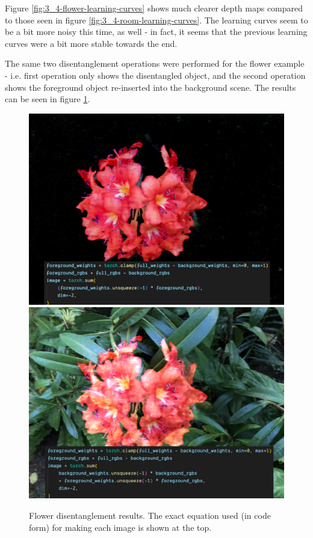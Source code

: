 Figure \ref{fig:3_4-flower-learning-curves} shows much clearer depth maps compared to those seen in figure \ref{fig:3_4-room-learning-curves}. The learning curves seem to be a bit more noisy this time, as well - in fact, it seems that the previous learning curves were a bit more stable towards the end.


The same two disentanglement operations were performed for the flower example - i.e. first operation only shows the disentangled object, and the second operation shows the foreground object re-inserted into the background scene. The results can be seen in figure \ref{fig:3_4-flower-disentanglement}.
\begin{figure}[H]
    \centering
    \includegraphics[width=1.0\textwidth]{figures/3_4-flower-fg.png}
    \includegraphics[width=1.0\textwidth]{figures/3_4-flower-recombined-no-rgbclamp.png}

    \caption{Flower disentanglement results. The exact equation used (in code form) for making each image is shown at the top.}
    \label{fig:3_4-flower-disentanglement}
\end{figure}

